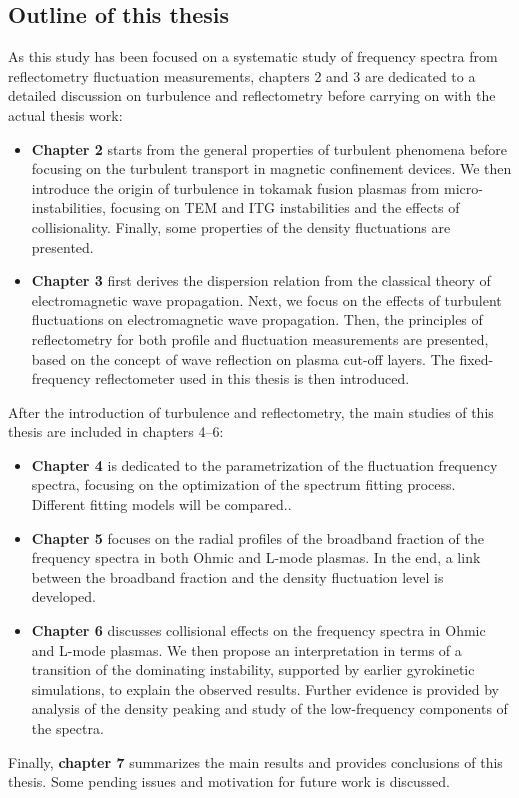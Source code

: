 \subsection{Outline of this thesis}

As this study has been focused on a systematic study of frequency spectra from reflectometry fluctuation measurements, chapters 2 and 3 are dedicated to a detailed discussion on turbulence and reflectometry before carrying on with the actual thesis work:%
\begin{itemize}

  \item \textbf{Chapter 2} starts from the general properties of turbulent phenomena before focusing on the turbulent transport in magnetic confinement devices. We then introduce the origin of turbulence in tokamak fusion plasmas from micro-instabilities, focusing on TEM and ITG instabilities and the effects of collisionality. Finally, some properties of the density fluctuations are presented.

  \item \textbf{Chapter 3} first derives the dispersion relation from the classical theory of electromagnetic wave propagation. Next, we focus on the effects of turbulent fluctuations on electromagnetic wave propagation. Then, the principles of reflectometry for both profile and fluctuation measurements are presented, based on the concept of wave reflection on plasma cut-off layers. The fixed-frequency reflectometer used in this thesis is then introduced.

\end{itemize}
\noindent After the introduction of turbulence and reflectometry, the main studies of this thesis are included in chapters 4--6:%
\begin{itemize}

  \item \textbf{Chapter 4} is dedicated to the parametrization of the fluctuation frequency spectra, focusing on the optimization of the spectrum fitting process. Different fitting models will be compared..

  \item \textbf{Chapter 5} focuses on the radial profiles of the broadband fraction of the frequency spectra in both Ohmic and L-mode plasmas. In the end, a link between the broadband fraction and the density fluctuation level is developed.

  \item \textbf{Chapter 6} discusses collisional effects on the frequency spectra in Ohmic and L-mode plasmas. We then propose an interpretation in terms of a transition of the dominating instability, supported by earlier gyrokinetic simulations, to explain the observed results. Further evidence is provided by analysis of the density peaking and study of the low-frequency components of the spectra.

\end{itemize}
\noindent Finally, \textbf{chapter 7} summarizes the main results and provides conclusions of this thesis. Some pending issues and motivation for future work is discussed.
